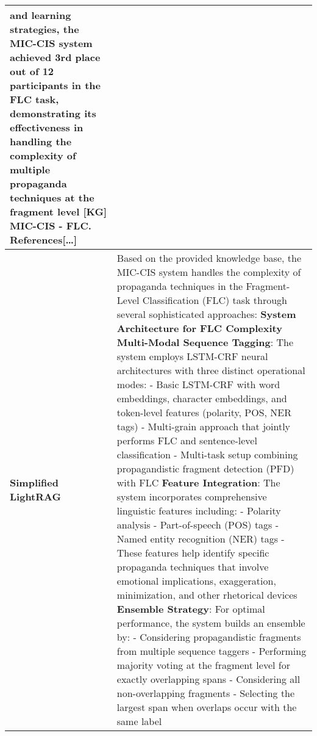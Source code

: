 \documentclass{article}
\begin{document}
\begin{table}[t]
{\begin{tabular}{|l|p{15cm}|}
    and learning strategies, the MIC-CIS system achieved 3rd place out of 12 
    participants in the FLC task, demonstrating its effectiveness in handling the 
    complexity of multiple propaganda techniques at the fragment level [KG] MIC-CIS - FLC. \newline
    \textbf{References}[\dots] \\ \hline
    \textbf{Simplified LightRAG} & 
    Based on the provided knowledge base, the MIC-CIS system handles the complexity 
    of propaganda techniques in the Fragment-Level Classification (FLC) task through 
    several sophisticated approaches: \newline
    \textbf{System Architecture for FLC Complexity} \newline
    \textbf{Multi-Modal Sequence Tagging}: The system employs LSTM-CRF neural architectures 
    with three distinct operational modes: \newline
    - Basic LSTM-CRF with word embeddings, character embeddings, and token-level features (polarity, POS, NER tags) \newline
    - Multi-grain approach that jointly performs FLC and sentence-level classification \newline
    - Multi-task setup combining propagandistic fragment detection (PFD) with FLC \newline
    \textbf{Feature Integration}: The system incorporates comprehensive linguistic 
    features including: \newline
    - Polarity analysis \newline
    - Part-of-speech (POS) tags \newline
    - Named entity recognition (NER) tags \newline
    - These features help identify specific propaganda techniques that involve emotional implications,
    exaggeration, minimization, and other rhetorical devices \newline
    \textbf{Ensemble Strategy}: For optimal performance, the system builds an ensemble by: \newline
    - Considering propagandistic fragments from multiple sequence taggers \newline 
    - Performing majority voting at the fragment level for exactly overlapping spans \newline
    - Considering all non-overlapping fragments \newline
    - Selecting the largest span when overlaps occur with the same label \newline

\end{tabular}}
\end{table}
\end{document}
